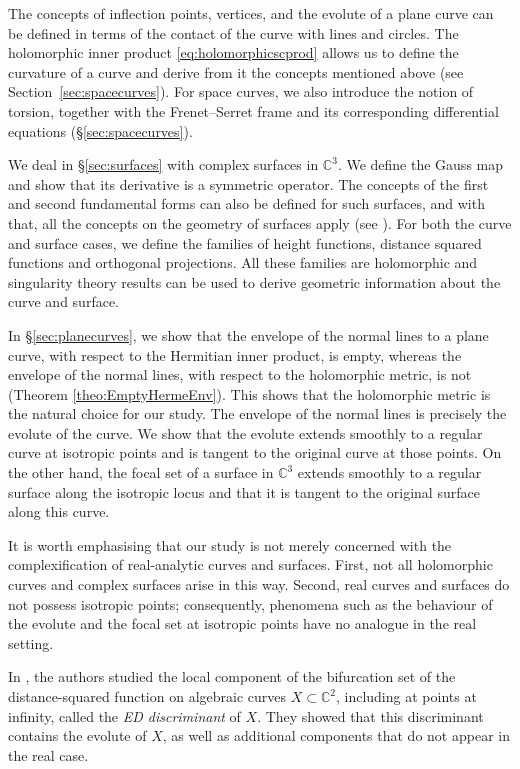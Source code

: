 \documentclass[12pt,a4paper]{article}
\begin{document}
The concepts of inflection points, vertices, and the evolute of a plane curve can be defined in terms of the contact of the curve with lines and circles. The holomorphic inner product \eqref{eq:holomorphicscprod} allows us to define the curvature of a curve and derive from it the concepts mentioned above (see Section~\ref{sec:spacecurves}). For space curves, we also introduce the notion of torsion, together with the Frenet–Serret frame and its corresponding differential equations (\S\ref{sec:spacecurves}).


We deal in \S \ref{sec:surfaces} with complex surfaces in $\mathbb C^3$. 
We define the Gauss map and show that its derivative is a symmetric operator. 
The concepts of the first and second fundamental forms can also be defined for such surfaces, and with that, all the concepts on the geometry of surfaces apply (see \cite{PessersVeken, Struik}).
For both the curve and surface cases, we define the families of height functions, distance squared  functions and orthogonal projections. All these families are holomorphic and singularity theory results can be used to derive geometric information about the curve and surface.

In \S\ref{sec:planecurves}, we show that the envelope of the normal lines to a plane curve, with respect to the Hermitian inner product, is empty, whereas the envelope of the normal lines, with respect to the holomorphic metric, is not (Theorem \ref{theo:EmptyHermeEnv}). This shows that the holomorphic metric is the natural choice for our study.
The envelope of the normal lines is precisely the evolute of the curve. We show that the evolute extends smoothly to a regular curve at isotropic points and is tangent to the original curve at those points.
On the other hand, the focal set of a surface in $\mathbb C^3$ extends smoothly to a regular surface along the isotropic locus and that it is tangent to the original surface along this curve.

It is worth emphasising that our study is not merely concerned with the complexification of real-analytic curves and surfaces. First, not all holomorphic curves and complex surfaces arise in this way. Second, real curves and surfaces do not possess isotropic points; consequently, phenomena such as the behaviour of the evolute and the focal set at isotropic points have no analogue in the real setting.

In \cite{JoitasSiersmaTibar}, the authors studied the local component of the bifurcation set of the distance-squared function on algebraic curves 
$X\subset \mathbb C^2$, including at points at infinity, called the 
\textit{ED discriminant} of 
$X$. They showed that this discriminant contains the evolute of 
$X$, as well as additional components that do not appear in the real case.
\end{document}
